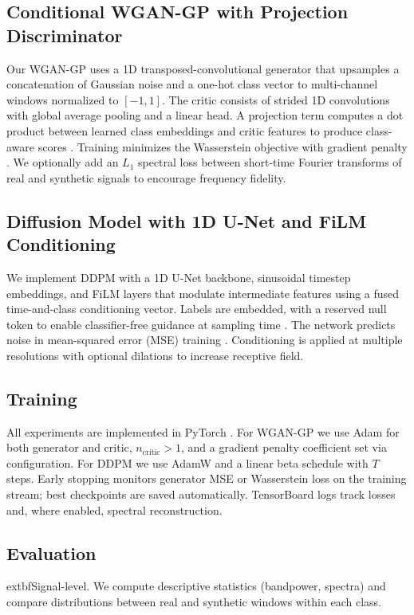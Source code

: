 \documentclass{article}
\begin{document}
\subsection{Conditional WGAN-GP with Projection Discriminator}
Our WGAN-GP uses a 1D transposed-convolutional generator that upsamples a concatenation of Gaussian noise and a one-hot class vector to multi-channel windows normalized to $[-1,1]$. The critic consists of strided 1D convolutions with global average pooling and a linear head. A projection term computes a dot product between learned class embeddings and critic features to produce class-aware scores \citep{miyato2018cgans}. Training minimizes the Wasserstein objective with gradient penalty \citep{gulrajani2017improved}. We optionally add an $L_1$ spectral loss between short-time Fourier transforms of real and synthetic signals to encourage frequency fidelity.

\subsection{Diffusion Model with 1D U-Net and FiLM Conditioning}
We implement DDPM with a 1D U-Net backbone, sinusoidal timestep embeddings, and FiLM layers that modulate intermediate features using a fused time-and-class conditioning vector. Labels are embedded, with a reserved null token to enable classifier-free guidance at sampling time \citep{ho2022classifierfree}. The network predicts noise in mean-squared error (MSE) training \citep{ho2020denoising}. Conditioning is applied at multiple resolutions with optional dilations to increase receptive field.

\subsection{Training}
All experiments are implemented in PyTorch \citep{paszke2019pytorch}. For WGAN-GP we use Adam \citep{kingma2015adam} for both generator and critic, $n_\text{critic}>1$, and a gradient penalty coefficient set via configuration. For DDPM we use AdamW \citep{loshchilov2019decoupled} and a linear beta schedule with $T$ steps. Early stopping monitors generator MSE or Wasserstein loss on the training stream; best checkpoints are saved automatically. TensorBoard logs track losses and, where enabled, spectral reconstruction.

\subsection{Evaluation}
	extbf{Signal-level.} We compute descriptive statistics (bandpower, spectra) and compare distributions between real and synthetic windows within each class.
\end{document}
